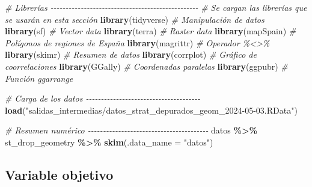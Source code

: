 \documentclass[12pt,a4paper,]{book}
\newenvironment{Shaded}{\begin{snugshade}}{\end{snugshade}}
\newcommand{\AttributeTok}[1]{\textcolor[rgb]{0.13,0.29,0.53}{#1}}
\newcommand{\CommentTok}[1]{\textcolor[rgb]{0.56,0.35,0.01}{\textit{#1}}}
\newcommand{\FunctionTok}[1]{\textcolor[rgb]{0.13,0.29,0.53}{\textbf{#1}}}
\newcommand{\NormalTok}[1]{#1}
\newcommand{\SpecialCharTok}[1]{\textcolor[rgb]{0.81,0.36,0.00}{\textbf{#1}}}
\newcommand{\StringTok}[1]{\textcolor[rgb]{0.31,0.60,0.02}{#1}}
\numberwithin{dummy}{section}
\theoremstyle{ocrenumbox}
\theoremstyle{blacknumex}
\theoremstyle{blacknumbox}
\theoremstyle{ocrenum}
\theoremstyle{ocrenum}
\begin{document}
\begin{Shaded}
\begin{Highlighting}[]
\CommentTok{\# Librerías {-}{-}{-}{-}{-}{-}{-}{-}{-}{-}{-}{-}{-}{-}{-}{-}{-}{-}{-}{-}{-}{-}{-}{-}{-}{-}{-}{-}{-}{-}{-}{-}{-}{-}{-}{-}{-}{-}{-}{-}{-}{-}{-}{-}{-}{-}{-}{-}{-}}
\CommentTok{\# Se cargan las librerías que se usarán en esta sección}
\FunctionTok{library}\NormalTok{(tidyverse) }\CommentTok{\# Manipulación de datos }
\FunctionTok{library}\NormalTok{(sf) }\CommentTok{\# Vector data}
\FunctionTok{library}\NormalTok{(terra) }\CommentTok{\# Raster data}
\FunctionTok{library}\NormalTok{(mapSpain) }\CommentTok{\# Polígonos de regiones de España}
\FunctionTok{library}\NormalTok{(magrittr) }\CommentTok{\# Operador \%\textless{}\textgreater{}\% }
\FunctionTok{library}\NormalTok{(skimr) }\CommentTok{\# Resumen de datos}
\FunctionTok{library}\NormalTok{(corrplot) }\CommentTok{\# Gráfico de coorrelaciones}
\FunctionTok{library}\NormalTok{(GGally) }\CommentTok{\# Coordenadas paralelas}
\FunctionTok{library}\NormalTok{(ggpubr) }\CommentTok{\# Función ggarrange}

\CommentTok{\# Carga de los datos {-}{-}{-}{-}{-}{-}{-}{-}{-}{-}{-}{-}{-}{-}{-}{-}{-}{-}{-}{-}{-}{-}{-}{-}{-}{-}{-}{-}{-}{-}{-}{-}{-}{-}{-}{-}{-}{-}}
\FunctionTok{load}\NormalTok{(}\StringTok{"salidas\_intermedias/datos\_strat\_depurados\_geom\_2024{-}05{-}03.RData"}\NormalTok{)}

\CommentTok{\# Resumen numérico {-}{-}{-}{-}{-}{-}{-}{-}{-}{-}{-}{-}{-}{-}{-}{-}{-}{-}{-}{-}{-}{-}{-}{-}{-}{-}{-}{-}{-}{-}{-}{-}{-}{-}{-}{-}{-}{-}{-}{-}}
\NormalTok{datos }\SpecialCharTok{\%\textgreater{}\%}\NormalTok{  st\_drop\_geometry }\SpecialCharTok{\%\textgreater{}\%} \FunctionTok{skim}\NormalTok{(}\AttributeTok{.data\_name =} \StringTok{"datos"}\NormalTok{)}
\end{Highlighting}
\end{Shaded}

\hypertarget{variable-objetivo}{%
\subsection{Variable objetivo}\label{variable-objetivo}}
\end{document}
